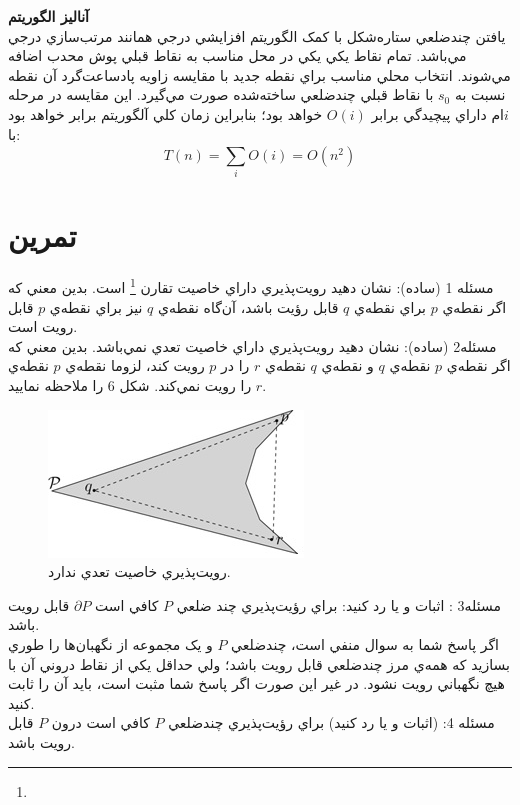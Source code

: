\documentclass{book}
\begin{document}
     \textbf{آنالیز الگوریتم}\\
يافتن چندضلعي ستاره‌شكل با کمک الگوريتم افزايشي درجي همانند مرتب‌سازي درجي مي‌باشد. تمام نقاط يکي يکي در محل مناسب به نقاط قبلي پوش محدب اضافه مي‌شوند. انتخاب محلي مناسب براي نقطه جديد با مقايسه زاويه پادساعت‌گرد آن نقطه نسبت به $s_{0}$ با نقاط قبلي چندضلعي ساخته‌شده صورت مي‌گيرد. اين مقايسه در مرحله $i$ام داراي پيچيدگي برابر $O(i)$ خواهد بود؛ بنابراين زمان کلي آلگوريتم برابر خواهد بود با:\\
$$T(n)= \sum_{i}^{}O(i)=O(n^{2})$$
\section*{تمرین}
مسئله 1 (ساده): نشان دهيد رويت‌پذيري داراي خاصيت تقارن  
\footnote{}
است. بدين معني که اگر نقطه‌ي $p$ براي نقطه‌ي $q$ قابل رؤيت باشد، آن‌گاه نقطه‌ي $q$ نيز براي نقطه‌ي $p$ قابل رويت است.\\

مسئله2 (ساده): نشان دهيد رويت‌پذيري داراي خاصيت تعدي  نمي‌باشد. بدين معني که اگر نقطه‌ي $p$ نقطه‌ي $q$ و نقطه‌ي $q$ نقطه‌ي $r$ را در $p$ رويت کند، لزوما نقطه‌ي $p$ نقطه‌ي $r$ را رويت نمي‌کند. شکل 6 را ملاحظه نماييد. \\
\begin{figure}[h!]
	\begin{center}
		\includegraphics{11.jpg}
		\caption{رويت‌پذيري خاصيت تعدي ندارد.}
	\end{center}
   	\label{شکل 11}
\end{figure}  

مسئله3 : اثبات و يا رد کنيد: براي رؤيت‌پذيري چند ضلعي $P$ كافي است   $\partial P$ قابل رويت باشد.\\

اگر پاسخ شما به سوال منفي است، چندضلعي $P$ و يک مجموعه از نگهبان‌ها را طوري بسازيد که همه‌ي مرز چندضلعي قابل رويت باشد؛ ولي حداقل يکي از نقاط دروني آن با هيچ نگهباني رويت نشود. در غير اين صورت اگر پاسخ‌ شما مثبت است، بايد آن را ثابت کنيد.\\

مسئله 4: (اثبات و يا رد کنيد) براي رؤيت‌پذيري چندضلعي $P$  كافي است درون $P$  قابل رويت باشد.\\
\end{document}
